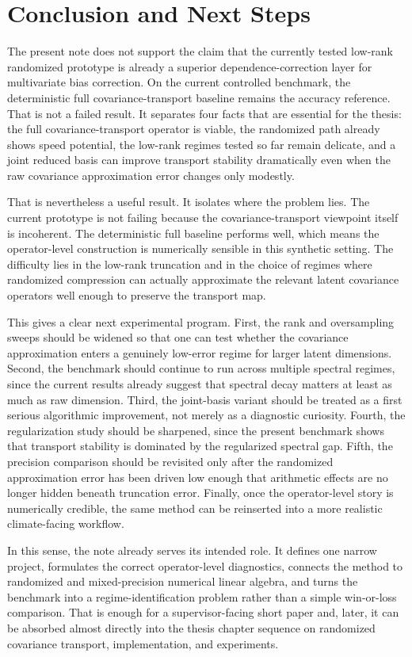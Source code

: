\documentclass[12pt,a4paper]{article}
\begin{document}
\section{Conclusion and Next Steps}

The present note does not support the claim that the currently tested low-rank randomized prototype is already a superior dependence-correction layer for multivariate bias correction. On the current controlled benchmark, the deterministic full covariance-transport baseline remains the accuracy reference. That is not a failed result. It separates four facts that are essential for the thesis: the full covariance-transport operator is viable, the randomized path already shows speed potential, the low-rank regimes tested so far remain delicate, and a joint reduced basis can improve transport stability dramatically even when the raw covariance approximation error changes only modestly.

That is nevertheless a useful result. It isolates where the problem lies. The current prototype is not failing because the covariance-transport viewpoint itself is incoherent. The deterministic full baseline performs well, which means the operator-level construction is numerically sensible in this synthetic setting. The difficulty lies in the low-rank truncation and in the choice of regimes where randomized compression can actually approximate the relevant latent covariance operators well enough to preserve the transport map.

This gives a clear next experimental program. First, the rank and oversampling sweeps should be widened so that one can test whether the covariance approximation enters a genuinely low-error regime for larger latent dimensions. Second, the benchmark should continue to run across multiple spectral regimes, since the current results already suggest that spectral decay matters at least as much as raw dimension. Third, the joint-basis variant should be treated as a first serious algorithmic improvement, not merely as a diagnostic curiosity. Fourth, the regularization study should be sharpened, since the present benchmark shows that transport stability is dominated by the regularized spectral gap. Fifth, the precision comparison should be revisited only after the randomized approximation error has been driven low enough that arithmetic effects are no longer hidden beneath truncation error. Finally, once the operator-level story is numerically credible, the same method can be reinserted into a more realistic climate-facing workflow.

In this sense, the note already serves its intended role. It defines one narrow project, formulates the correct operator-level diagnostics, connects the method to randomized and mixed-precision numerical linear algebra, and turns the benchmark into a regime-identification problem rather than a simple win-or-loss comparison. That is enough for a supervisor-facing short paper and, later, it can be absorbed almost directly into the thesis chapter sequence on randomized covariance transport, implementation, and experiments.

\printbibliography
\end{document}
